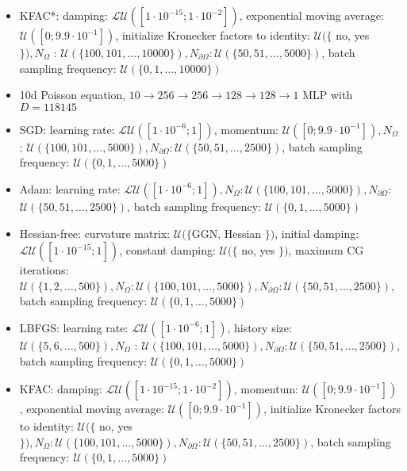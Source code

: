 \documentclass[10pt]{article}
\begin{document}
\begin{itemize}
  \item KFAC*: damping: $\mathcal{L U}\left(\left[1 \cdot 10^{-15} ; 1 \cdot 10^{-2}\right]\right)$, exponential moving average: $\mathcal{U}\left(\left[0 ; 9.9 \cdot 10^{-1}\right]\right)$, initialize Kronecker factors to identity: $\mathcal{U}(\{$ no, yes $\}), N_{\Omega}$ : $\mathcal{U}(\{100,101, \ldots, 10000\}), N_{\partial \Omega}: \mathcal{U}(\{50,51, \ldots, 5000\})$, batch sampling frequency: $\mathcal{U}(\{0,1, \ldots, 10000\})$
  \item 10d Poisson equation, $10 \rightarrow 256 \rightarrow 256 \rightarrow 128 \rightarrow 128 \rightarrow 1$ MLP with $D=118145$
  \item SGD: learning rate: $\mathcal{L U}\left(\left[1 \cdot 10^{-6} ; 1\right]\right)$, momentum: $\mathcal{U}\left(\left[0 ; 9.9 \cdot 10^{-1}\right]\right), N_{\Omega}$ : $\mathcal{U}(\{100,101, \ldots, 5000\}), N_{\partial \Omega}: \mathcal{U}(\{50,51, \ldots, 2500\})$, batch sampling frequency: $\mathcal{U}(\{0,1, \ldots, 5000\})$
  \item Adam: learning rate: $\mathcal{L U}\left(\left[1 \cdot 10^{-6} ; 1\right]\right), N_{\Omega}: \mathcal{U}(\{100,101, \ldots, 5000\}), N_{\partial \Omega}:$ $\mathcal{U}(\{50,51, \ldots, 2500\})$, batch sampling frequency: $\mathcal{U}(\{0,1, \ldots, 5000\})$
  \item Hessian-free: curvature matrix: $\mathcal{U}(\{\mathrm{GGN}$, Hessian $\})$, initial damping: $\mathcal{L U}\left(\left[1 \cdot 10^{-15} ; 1\right]\right)$, constant damping: $\mathcal{U}(\{$ no, yes $\})$, maximum CG iterations: $\mathcal{U}(\{1,2, \ldots, 500\}), N_{\Omega}: \mathcal{U}(\{100,101, \ldots, 5000\}), N_{\partial \Omega}: \mathcal{U}(\{50,51, \ldots, 2500\})$, batch sampling frequency: $\mathcal{U}(\{0,1, \ldots, 5000\})$
  \item LBFGS: learning rate: $\mathcal{L U}\left(\left[1 \cdot 10^{-6} ; 1\right]\right)$, history size: $\mathcal{U}(\{5,6, \ldots, 500\}), N_{\Omega}$ : $\mathcal{U}(\{100,101, \ldots, 5000\}), N_{\partial \Omega}: \mathcal{U}(\{50,51, \ldots, 2500\})$, batch sampling frequency: $\mathcal{U}(\{0,1, \ldots, 5000\})$
  \item KFAC: damping: $\mathcal{L U}\left(\left[1 \cdot 10^{-15} ; 1 \cdot 10^{-2}\right]\right)$, momentum: $\mathcal{U}\left(\left[0 ; 9.9 \cdot 10^{-1}\right]\right)$, exponential moving average: $\mathcal{U}\left(\left[0 ; 9.9 \cdot 10^{-1}\right]\right)$, initialize Kronecker factors to identity: $\mathcal{U}(\{$ no, yes $\}), N_{\Omega}: \mathcal{U}(\{100,101, \ldots, 5000\}), N_{\partial \Omega}: \mathcal{U}(\{50,51, \ldots, 2500\})$, batch sampling frequency: $\mathcal{U}(\{0,1, \ldots, 5000\})$

\end{itemize}
\end{document}
